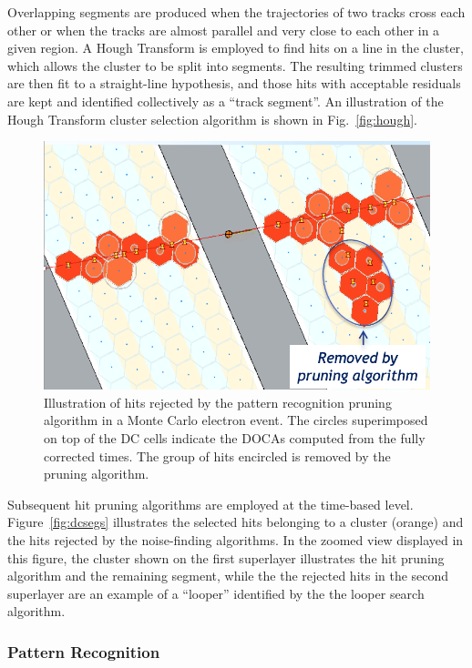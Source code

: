 Overlapping segments are produced when the trajectories of two tracks cross each other or when the tracks are
almost parallel and very close to each other in a given region. A Hough Transform is employed to find hits on a line
in the cluster, which allows the cluster to be split into segments.  The resulting trimmed clusters are then fit to a
straight-line hypothesis, and those hits with acceptable residuals are kept and identified collectively as a
``track segment''. An illustration of the Hough Transform cluster selection algorithm is shown in Fig.~\ref{fig:hough}.

\begin{figure}[t]
\centering
\includegraphics[width=0.9\columnwidth]{pics/dcPattern2.png}
\caption{Illustration of hits rejected by the pattern recognition pruning algorithm in a Monte Carlo electron
  event. The circles superimposed on top of the DC cells indicate the DOCAs computed from the fully corrected
  times. The group of hits encircled is removed by the pruning algorithm.}
\label{fig:strings}
\end{figure}

Subsequent hit pruning algorithms are employed at the time-based level. Figure~\ref{fig:dcsegs} illustrates the
selected hits belonging to a cluster (orange) and the hits rejected by the noise-finding algorithms. 
{\color{red}In the zoomed view displayed in this figure,
the cluster shown on the first superlayer illustrates the hit pruning algorithm and 
the remaining segment, while the the rejected hits in the second superlayer are an example of a ``looper'' identified 
by the the looper search algorithm.}
  
\subsubsection{Pattern Recognition}

